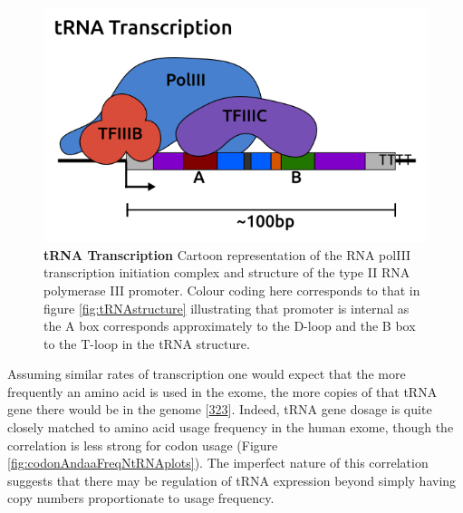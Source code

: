\documentclass[
]{book}
\begin{document}
\begin{figure}

{\centering \includegraphics[width=1\linewidth]{./figs/tRNA-PollIII_white} 

}

\caption{\textbf{tRNA Transcription} Cartoon representation of the RNA polIII transcription initiation complex and structure of the type II RNA polymerase III promoter. Colour coding here corresponds to that in figure \ref{fig:tRNAstructure} illustrating that promoter is internal as the A box corresponds approximately to the D-loop and the B box to the T-loop in the tRNA structure.}\label{fig:tRNApromoter}
\end{figure}



Assuming similar rates of transcription one would expect that the more frequently an amino acid is used in the exome, the more copies of that tRNA gene there would be in the genome {[}\protect\hyperlink{ref-Gingold2012}{323}{]}.
Indeed, tRNA gene dosage is quite closely matched to amino acid usage frequency in the human exome, though the correlation is less strong for codon usage (Figure \ref{fig:codonAndaaFreqNtRNAplots}).
The imperfect nature of this correlation suggests that there may be regulation of tRNA expression beyond simply having copy numbers proportionate to usage frequency.
\end{document}
